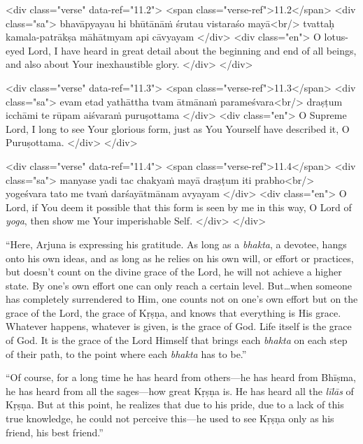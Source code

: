 \begin{html}
<div class="verse" data-ref="11.2">
  <span class="verse-ref">11.2</span>
  <div class="sa">
    bhavāpyayau hi bhūtānāṁ śrutau vistaraśo mayā<br/>
    tvattaḥ kamala-patrākṣa māhātmyam api cāvyayam
  </div>
  <div class="en">
    O lotus-eyed Lord, I have heard in great detail about the beginning and end of all beings, and also about Your inexhaustible glory.
  </div>
</div>
\end{html}



\begin{html}
<div class="verse" data-ref="11.3">
  <span class="verse-ref">11.3</span>
  <div class="sa">
    evam etad yathāttha tvam ātmānaṁ parameśvara<br/>
    draṣṭum icchāmi te rūpam aiśvaraṁ puruṣottama
  </div>
  <div class="en">
    O Supreme Lord, I long to see Your glorious form, just as You Yourself have described it, O Puruṣottama.
  </div>
</div>
\end{html}



\begin{html}
<div class="verse" data-ref="11.4">
  <span class="verse-ref">11.4</span>
  <div class="sa">
    manyase yadi tac chakyaṁ mayā draṣṭum iti prabho<br/>
    yogeśvara tato me tvaṁ darśayātmānam avyayam
  </div>
  <div class="en">
    O Lord, if You deem it possible that this form is seen by me in this way, O Lord of \textit{yoga}, then show me Your imperishable Self.
  </div>
</div>
\end{html}


\enquote{Here, Arjuna is expressing his gratitude. As long as a \textit{bhakta}, a devotee, hangs onto his own ideas, and as long as he relies on his own will, or effort or practices, but doesn’t count on the divine grace of the Lord, he will not achieve a higher state. By one’s own effort one can only reach a certain level. But\ldots when someone has completely surrendered to Him, one counts not on one’s own effort but on the grace of the Lord, the grace of Kṛṣṇa, and knows that everything is His grace. Whatever happens, whatever is given, is the grace of God. Life itself is the grace of God. It is the grace of the Lord Himself that brings each \textit{bhakta} on each step of their path, to the point where each \textit{bhakta} has to be.}

\enquote{Of course, for a long time he has heard from others---he has heard from Bhīṣma, he has heard from all the sages---how great Kṛṣṇa is. He has heard all the \textit{līlās} of Kṛṣṇa. But at this point, he realizes that due to his pride, due to a lack of this true knowledge, he could not perceive this---he used to see Kṛṣṇa only as his friend, his best friend.}

